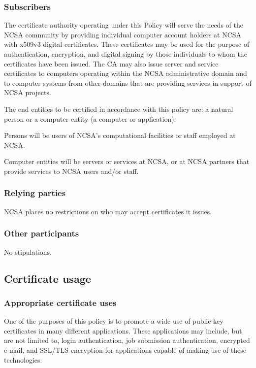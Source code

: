 \documentclass[10pt]{article}
\begin{document}
\subsubsection{Subscribers}

The certificate authority operating under this Policy will serve the
needs of the NCSA community by providing individual computer account
holders at NCSA with x509v3 digital certificates.  These certificates
may be used for the purpose of authentication, encryption, and digital
signing by those individuals to whom the certificates have been
issued.  The CA may also issue server and service certificates to
computers operating within the NCSA administrative domain and to
computer systems from other domains that are providing services in
support of NCSA projects.

The end entities to be certified in accordance with this policy are: a
natural person or a computer entity (a computer or application).

Persons will be users of NCSA’s computational facilities or staff
employed at NCSA.

Computer entities will be servers or services at NCSA, or at NCSA
partners that provide services to NCSA users and/or staff.

\subsubsection{Relying parties}

NCSA places no restrictions on who may accept certificates it issues.

\subsubsection{Other participants}

No stipulations.

\subsection{Certificate usage}

\subsubsection{Appropriate certificate uses}

One of the purposes of this policy is to promote a wide use of
public-key certificates in many different applications.  These
applications may include, but are not limited to, login
authentication, job submission authentication, encrypted e-mail, and
SSL/TLS encryption for applications capable of making use of these
technologies.
\end{document}

